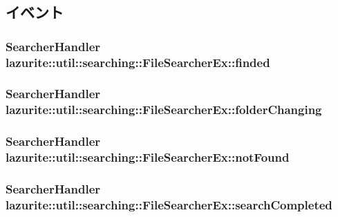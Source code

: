 \subsection{イベント}
\hypertarget{classlazurite_1_1util_1_1searching_1_1_file_searcher_ex_a8230aa9c4e9d1cb9e0d5098692986b18}{
\subsubsection[{finded}]{\setlength{\rightskip}{0pt plus 5cm}SearcherHandler lazurite::util::searching::FileSearcherEx::finded}}
\label{classlazurite_1_1util_1_1searching_1_1_file_searcher_ex_a8230aa9c4e9d1cb9e0d5098692986b18}
\hypertarget{classlazurite_1_1util_1_1searching_1_1_file_searcher_ex_a666b37d0438a9574a72240b6cea7c2ca}{
\subsubsection[{folderChanging}]{\setlength{\rightskip}{0pt plus 5cm}SearcherHandler lazurite::util::searching::FileSearcherEx::folderChanging}}
\label{classlazurite_1_1util_1_1searching_1_1_file_searcher_ex_a666b37d0438a9574a72240b6cea7c2ca}
\hypertarget{classlazurite_1_1util_1_1searching_1_1_file_searcher_ex_ac22944b2f2578ef04bd9e233a0ca2a2d}{
\subsubsection[{notFound}]{\setlength{\rightskip}{0pt plus 5cm}SearcherHandler lazurite::util::searching::FileSearcherEx::notFound}}
\label{classlazurite_1_1util_1_1searching_1_1_file_searcher_ex_ac22944b2f2578ef04bd9e233a0ca2a2d}
\hypertarget{classlazurite_1_1util_1_1searching_1_1_file_searcher_ex_a68148235f69ad9ff76a9bf3a6b1a9aab}{
\subsubsection[{searchCompleted}]{\setlength{\rightskip}{0pt plus 5cm}SearcherHandler lazurite::util::searching::FileSearcherEx::searchCompleted}}
